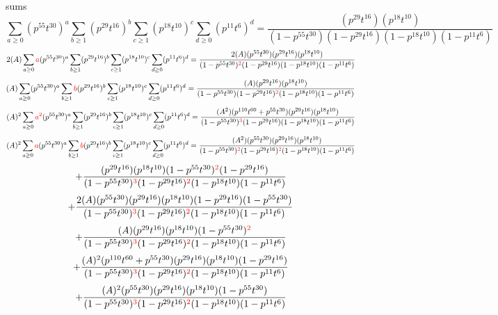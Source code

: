 \documentclass{article}
\begin{document}
sums\[\sum_{a\geq{0}}(p^{55}t^{30})^{a}\sum_{b\geq{1}}(p^{29}t^{16})^{b}\sum_{c\geq{1}}(p^{18}t^{10})^{c}\sum_{d\geq{0}}(p^{11}t^{6})^{d}=\frac{(p^{29}t^{16})(p^{18}t^{10})}{(1-p^{55}t^{30})(1-p^{29}t^{16})(1-p^{18}t^{10})(1-p^{11}t^{6})}\]\[2(A)\sum_{a\geq{0}}\textcolor{red}{a}(p^{55}t^{30})^{a}\sum_{b\geq{1}}(p^{29}t^{16})^{b}\sum_{c\geq{1}}(p^{18}t^{10})^{c}\sum_{d\geq{0}}(p^{11}t^{6})^{d}=\frac{2(A)(p^{55}t^{30})(p^{29}t^{16})(p^{18}t^{10})}{(1-p^{55}t^{30})^{\textcolor{red}{2}}(1-p^{29}t^{16})(1-p^{18}t^{10})(1-p^{11}t^{6})}\]\[(A)\sum_{a\geq{0}}(p^{55}t^{30})^{a}\sum_{b\geq{1}}\textcolor{red}{b}(p^{29}t^{16})^{b}\sum_{c\geq{1}}(p^{18}t^{10})^{c}\sum_{d\geq{0}}(p^{11}t^{6})^{d}=\frac{(A)(p^{29}t^{16})(p^{18}t^{10})}{(1-p^{55}t^{30})(1-p^{29}t^{16})^{\textcolor{red}{2}}(1-p^{18}t^{10})(1-p^{11}t^{6})}\]\[(A)^{2}\sum_{a\geq{0}}\textcolor{red}{a^{2}}(p^{55}t^{30})^{a}\sum_{b\geq{1}}(p^{29}t^{16})^{b}\sum_{c\geq{1}}(p^{18}t^{10})^{c}\sum_{d\geq{0}}(p^{11}t^{6})^{d}=\frac{(A^{2})(p^{110}t^{60}+p^{55}t^{30})(p^{29}t^{16})(p^{18}t^{10})}{(1-p^{55}t^{30})^{\textcolor{red}{3}}(1-p^{29}t^{16})(1-p^{18}t^{10})(1-p^{11}t^{6})}\]\[(A)^{2}\sum_{a\geq{0}}\textcolor{red}{a}(p^{55}t^{30})^{a}\sum_{b\geq{1}}\textcolor{red}{b}(p^{29}t^{16})^{b}\sum_{c\geq{1}}(p^{18}t^{10})^{c}\sum_{d\geq{0}}(p^{11}t^{6})^{d}=\frac{(A^{2})(p^{55}t^{30})(p^{29}t^{16})(p^{18}t^{10})}{(1-p^{55}t^{30})^{\textcolor{red}{2}}(1-p^{29}t^{16})^{\textcolor{red}{2}}(1-p^{18}t^{10})(1-p^{11}t^{6})}\]\[+\frac{(p^{29}t^{16})(p^{18}t^{10})(1-p^{55}t^{30})^{\textcolor{red}{2}}(1-p^{29}t^{16})}{(1-p^{55}t^{30})^{\textcolor{red}{3}}(1-p^{29}t^{16})^{\textcolor{red}{2}}(1-p^{18}t^{10})(1-p^{11}t^{6})}\]\[+\frac{2(A)(p^{55}t^{30})(p^{29}t^{16})(p^{18}t^{10})(1-p^{29}t^{16})(1-p^{55}t^{30})}{(1-p^{55}t^{30})^{\textcolor{red}{3}}(1-p^{29}t^{16})^{\textcolor{red}{2}}(1-p^{18}t^{10})(1-p^{11}t^{6})}\]\[+\frac{(A)(p^{29}t^{16})(p^{18}t^{10})(1-p^{55}t^{30})^{\textcolor{red}{2}}}{(1-p^{55}t^{30})^{\textcolor{red}{3}}(1-p^{29}t^{16})^{\textcolor{red}{2}}(1-p^{18}t^{10})(1-p^{11}t^{6})}\]\[+\frac{(A)^{2}(p^{110}t^{60}+p^{55}t^{30})(p^{29}t^{16})(p^{18}t^{10})(1-p^{29}t^{16})}{(1-p^{55}t^{30})^{\textcolor{red}{3}}(1-p^{29}t^{16})^{\textcolor{red}{2}}(1-p^{18}t^{10})(1-p^{11}t^{6})}\]\[+\frac{(A)^{2}(p^{55}t^{30})(p^{29}t^{16})(p^{18}t^{10})(1-p^{55}t^{30})}{(1-p^{55}t^{30})^{\textcolor{red}{3}}(1-p^{29}t^{16})^{\textcolor{red}{2}}(1-p^{18}t^{10})(1-p^{11}t^{6})}\]
\end{document}
